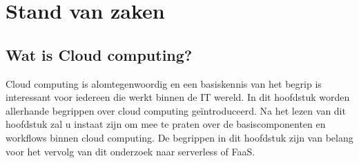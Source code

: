 \chapter{Stand van zaken}
\label{ch:stand-van-zaken}



%
%

\section{Wat is Cloud computing?}
 
Cloud computing is alomtegenwoordig en een basiskennis van het begrip is interessant voor iedereen die werkt binnen de IT wereld. In dit hoofdstuk worden allerhande begrippen over cloud computing geïntroduceerd. Na het lezen van dit hoofdstuk zal u instaat zijn om mee te praten over de basiscomponenten en workflows binnen cloud computing. De begrippen in dit hoofdstuk zijn van belang voor het vervolg van dit onderzoek naar serverless of FaaS.

